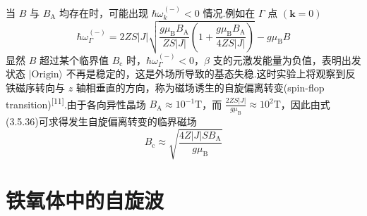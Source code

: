 当 $B$ 与 $B_{\mathrm{A}}$ 均存在时，可能出现
$\hbar\omega_k^{(-)}<0$ 情况.例如在 $\Gamma$ 点 $\left(\boldsymbol{k}=0\right)$
\begin{equation}
  \hbar\omega_{\Gamma}^{(-)}=2ZS\left|J\right|
  \sqrt{\frac{g\mu_{\mathrm{B}}B_{\mathrm{A}}}{ZS\left|J\right|}
  \left(1+\frac{g\mu_{\mathrm{B}}B_{\mathrm{A}}}{4ZS\left|J\right|}\right)}
  -g\mu_{\mathrm{B}}B
\end{equation}
显然 $B$ 超过某个临界值 $B_{\mathrm{c}}$ 时，$\hbar\omega_{\Gamma}^{(-)}<0$，$\beta$
支的元激发能量为负值，表明出发状态 $|\mathrm{Origin}\rangle$
不再是稳定的，这是外场所导致的基态失稳.这时实验上将观察到反铁磁序转向与 $z$
轴相垂直的方向，称为磁场诱生的自旋偏离转变(spin-flop
transition)\textsuperscript{[11]}.由于各向异性晶场
$B_{\mathrm{A}}\approx10^{-1}\mathrm{T}$，而
$\frac{2ZS\left|J\right|}{g\mu_{\mathrm{B}}}\approx10^2\mathrm{T}$，因此由式(3.5.36)可求得发生自旋偏离转变的临界磁场
\begin{equation}
  B_{\mathrm{c}}\approx\sqrt{\frac{4Z\left|J\right|SB_{\mathrm{A}}}{g\mu_{\mathrm{B}}}}
\end{equation}

\section{铁氧体中的自旋波}

